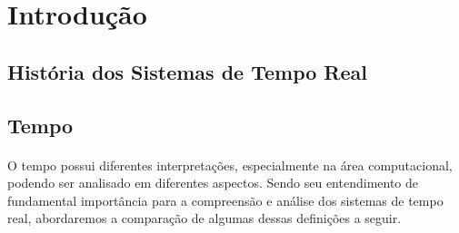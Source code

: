 \section{Introdução}
\subsection{História dos Sistemas de Tempo Real}

\subsection{Tempo}
\paragraph{}
O tempo possui diferentes interpretações, especialmente na área computacional,
podendo ser analisado em diferentes aspectos. Sendo seu entendimento de
fundamental importância para a compreensão e análise dos sistemas de tempo
real, abordaremos a comparação de algumas dessas definições a seguir.~\cite{FARINESSIS00}

